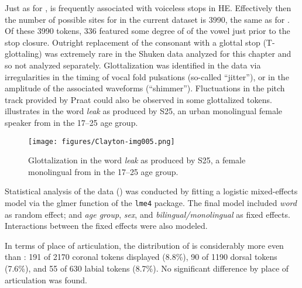\documentclass[output=paper,colorlinks,citecolor=brown]{langscibook}
\begin{document}
Just as for ,  is frequently associated with voiceless stops in HE. Effectively then the number of possible sites for  in the current dataset is 3990, the same as for . Of these 3990 tokens, 336 featured some degree of  of the vowel just prior to the stop closure. Outright replacement of the consonant with a glottal stop (T-glottaling) was extremely rare in the Shuken data analyzed for this chapter and so not analyzed separately. Glottalization was identified in the data via irregularities in the timing of vocal fold pulsations (so-called “jitter”), or in the amplitude of the associated waveforms (“shimmer”). Fluctuations in the pitch track provided by Praat could also be observed in some glottalized tokens.  illustrates  in the word \textit{leak} as produced by S25, an urban monolingual female speaker from  in the 17--25 age group. 

\begin{figure}[ht]
\texttt{[image: figures/Clayton-img005.png]}
\caption{Glottalization in the word \textit{leak} as produced by S25, a female monolingual from  in the 17--25 age group.}
\label{fig:5}
\end{figure}

Statistical analysis of the  data () was conducted by fitting a logistic mixed-effects model via the glmer function of the \texttt{lme4} package. The final model included \textit{word} as random effect; and \textit{age group}, \textit{sex}, and \textit{bilingual/monolingual} as fixed effects. Interactions between the fixed effects were also modeled.

In terms of place of articulation, the distribution of  is considerably more even than : 191 of 2170 coronal tokens displayed  (8.8\%), 90 of 1190 dorsal tokens (7.6\%), and 55 of 630 labial tokens (8.7\%). No significant difference by place of articulation was found. 
\end{document}
